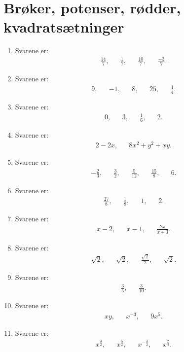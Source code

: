 \section{Brøker, potenser, rødder, kvadratsætninger}

\begin{enumerate}
\item Svarene er:
\begin{align*}
\frac{14}{7},&& \frac{1}{7},&& \frac{10}{7},&& \frac{-3}{7}.
\end{align*}

\item Svarene er:
\begin{align*}
9,&& -1,&& 8,&& 25,&& \frac{1}{4}.
\end{align*}

\item Svarene er:
\begin{align*}
0,&& 3,&& \frac{1}{6},&& 2.
\end{align*}
\item Svarene er:
\begin{align*}
2-2x,&& 8x^2+y^2+xy.
\end{align*}

\item Svarene er:
\begin{align*}
-\frac{2}{3},&&\frac{3}{2},&& \frac{5}{12},&& \frac{15}{8},&& 6.
\end{align*}

\item Svarene er:
\begin{align*}
\frac{27}{8},&& \frac{1}{8},&& 1,&& 2.
\end{align*}

\item Svarene er:
\begin{align*}
x-2,&& x-1,&&\frac{2x}{x+3}.
\end{align*}

\item Svarene er:
\begin{align*}
\sqrt{2},&& \sqrt{2},&& \frac{\sqrt{2}}{2},&& \sqrt{2}.
\end{align*}

\item Svarene er:
\begin{align*}
\frac{3}{5},&&\frac{3}{10}.
\end{align*}

\item Svarene er:
\begin{align*}
xy,&& x^{-3},&& 9x^5.
\end{align*}




\item Svarene er:
\begin{align*}
x^{\frac{3}{2}},&& x^{\frac{5}{2}},&& x^{-\frac{3}{2}},&& x^{\frac{7}{3}}.
\end{align*}



















\end{enumerate}

